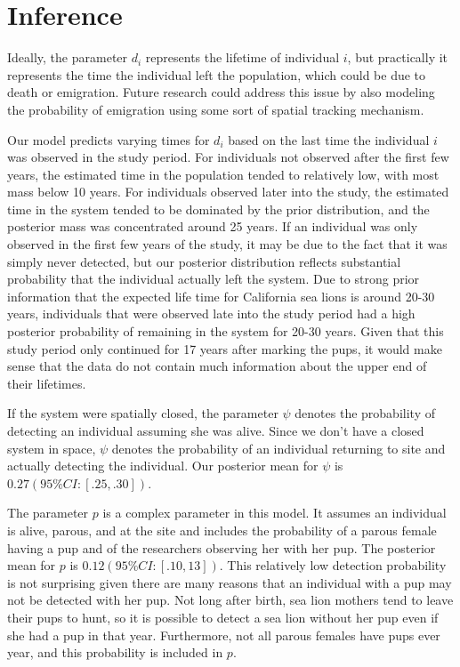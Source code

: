 \documentclass[12pt, a4paper]{article}
\begin{document}
\section{Inference}

Ideally, the parameter $d_i$ represents the lifetime of individual $i$, but practically it represents the time the individual left the population, which could be due to death or emigration. Future research could address this issue by also modeling the probability of emigration using some sort of spatial tracking mechanism. 

Our model predicts varying times for $d_i$ based on the last time the individual $i$ was observed in the study period. For individuals not observed after the first few years, the estimated time in the population tended to relatively low, with most mass below 10 years. For individuals observed later into the study, the estimated time in the system tended to be dominated by the prior distribution, and the posterior mass was concentrated around 25 years. If an individual was only observed in the first few years of the study, it may be due to the fact that it was simply never detected, but our posterior distribution reflects substantial probability that the individual actually left the system. Due to strong prior information that the expected life time for California sea lions is around 20-30 years, individuals that were observed late into the study period had a high posterior probability of remaining in the system for 20-30 years. Given that this study period only continued for 17 years after marking the pups, it would make sense that the data do not contain much information about the upper end of their lifetimes.  

If the system were spatially closed, the parameter $\psi$ denotes the probability of detecting an individual assuming she was alive. Since we don't have a closed system in space, $\psi$ denotes the probability of an individual returning to site and actually detecting the individual. Our posterior mean for $\psi$ is $0.27 (95\% CI: [.25, .30])$. 

The parameter $p$ is a complex parameter in this model. It assumes an individual is alive, parous, and at the site and includes the probability of a parous female having a pup and of the researchers observing her with her pup. The posterior mean for $p$ is $0.12 (95\% CI: [.10, 13])$. This relatively low detection probability is not surprising given there are many reasons that an individual with a pup may not be detected with her pup. Not long after birth, sea lion mothers tend to leave their pups to hunt, so it is possible to detect a sea lion without her pup even if she had a pup in that year. Furthermore, not all parous females have pups ever year, and this probability is included in $p$. 
\end{document}
